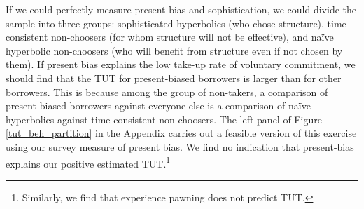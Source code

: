 \documentclass[12pt, a4paper, colorinlistoftodos]{article}
\begin{document}
If we could perfectly measure present bias and sophistication, we could divide the sample into three groups: sophisticated hyperbolics (who chose structure), time-consistent non-choosers (for whom structure will not be effective), and na\"{i}ve hyperbolic non-choosers (who will benefit from structure even if not chosen by them). %
If present bias explains the low take-up rate of voluntary commitment, we should find that the TUT for present-biased borrowers is larger than for other borrowers. This is because among the group of non-takers, a comparison of present-biased borrowers against everyone else is a comparison of na\"{i}ve hyperbolics against time-consistent non-choosers. The left panel of Figure \ref{tut_beh_partition} in the Appendix carries out a feasible version of this exercise using our survey measure of present bias.
We find no indication that present-bias explains our positive estimated TUT.\footnote{Similarly, we find that experience pawning does not predict TUT.}



\end{document}
